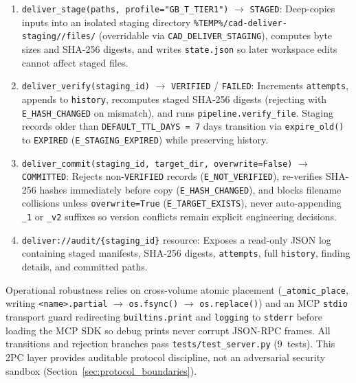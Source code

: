 \documentclass[nocopyright,nolists,upint,varvw,hyphenate]{asmejour}
\begin{document}
\begin{enumerate}
\item \texttt{deliver\_\allowbreak stage(paths, profile=\allowbreak "GB\_T\_TIER1")} $\to$ \texttt{STAGED}: Deep-copies inputs into an isolated staging directory \texttt{\%TEMP\%/\allowbreak cad-deliver-staging//\allowbreak files/} (overridable via \texttt{CAD\_\allowbreak DELIVER\_\allowbreak STAGING}), computes byte sizes and SHA-256 digests, and writes \texttt{state.json} so later workspace edits cannot affect staged files.
\item \texttt{deliver\_verify(staging\_id)} $\to$ \texttt{VERIFIED} / \texttt{FAILED}: Increments \texttt{attempts}, appends to \texttt{history}, recomputes staged SHA-256 digests (rejecting with \texttt{E\_HASH\_CHANGED} on mismatch), and runs \texttt{pipeline.verify\_file}. Staging records older than \texttt{DEFAULT\_TTL\_DAYS = 7} days transition via \texttt{expire\_old()} to \texttt{EXPIRED} (\texttt{E\_STAGING\_EXPIRED}) while preserving history.
\item \texttt{deliver\_\allowbreak commit(staging\_id, target\_dir, overwrite=False)} $\to$ \texttt{COMMITTED}: Rejects non-\texttt{VERIFIED} records (\texttt{E\_\allowbreak NOT\_\allowbreak VERIFIED}), re-verifies SHA-256 hashes immediately before copy (\texttt{E\_\allowbreak HASH\_\allowbreak CHANGED}), and blocks filename collisions unless \texttt{overwrite=True} (\texttt{E\_\allowbreak TARGET\_\allowbreak EXISTS}), never auto-appending \texttt{\_1} or \texttt{\_v2} suffixes so version conflicts remain explicit engineering decisions.
\item \texttt{deliver://audit/\{staging\_id\}} resource: Exposes a read-only JSON log containing staged manifests, SHA-256 digests, \texttt{attempts}, full \texttt{history}, finding details, and committed paths.
\end{enumerate}

Operational robustness relies on cross-volume atomic placement (\texttt{\_atomic\_place}, writing \texttt{<name>.partial} $\to$ \texttt{os.fsync()} $\to$ \texttt{os.replace()}) and an MCP \texttt{stdio} transport guard redirecting \texttt{builtins.print} and \texttt{logging} to \texttt{stderr} before loading the MCP SDK so debug prints never corrupt JSON-RPC frames. All transitions and rejection branches pass \texttt{tests/test\_server.py} (9~tests). This 2PC layer provides auditable protocol discipline, not an adversarial security sandbox (Section~\ref{sec:protocol_boundaries}).
\end{document}
